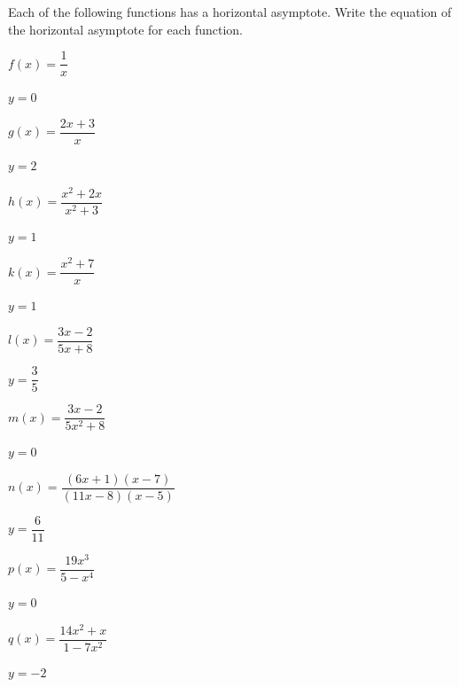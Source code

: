 \begin{exercises}
	 \begin{problem}
	 Each of the following functions has a horizontal asymptote. Write the equation
	 of the horizontal asymptote for each function.
	 \begin{multicols}{3}
		 \begin{subproblem}
			 $f(x) = \dfrac{1}{x}$
			 \begin{shortsolution}
				 $y=0$
			 \end{shortsolution}
		 \end{subproblem}
		 \begin{subproblem}
			 $g(x) = \dfrac{2x+3}{x}$
			 \begin{shortsolution}
				 $y=2$
			 \end{shortsolution}
		 \end{subproblem}
		 \begin{subproblem}
			 $h(x) = \dfrac{x^2+2x}{x^2+3}$
			 \begin{shortsolution}
				 $y=1$
			 \end{shortsolution}
		 \end{subproblem}
		 \begin{subproblem}
			 $k(x) = \dfrac{x^2+7}{x}$
			 \begin{shortsolution}
				 $y=1$
			 \end{shortsolution}
		 \end{subproblem}
		 \begin{subproblem}
			 $l(x)=\dfrac{3x-2}{5x+8}$
			 \begin{shortsolution}
				 $y=\dfrac{3}{5}$
			 \end{shortsolution}
		 \end{subproblem}
		 \begin{subproblem}
			 $m(x)=\dfrac{3x-2}{5x^2+8}$
			 \begin{shortsolution}
				 $y=0$
			 \end{shortsolution}
		 \end{subproblem}
		 \begin{subproblem}
			 $n(x)=\dfrac{(6x+1)(x-7)}{(11x-8)(x-5)}$
			 \begin{shortsolution}
				 $y=\dfrac{6}{11}$
			 \end{shortsolution}
		 \end{subproblem}
		 \begin{subproblem}
			 $p(x)=\dfrac{19x^3}{5-x^4}$
			 \begin{shortsolution}
				 $y=0$
			 \end{shortsolution}
		 \end{subproblem}
		 \begin{subproblem}
			 $q(x)=\dfrac{14x^2+x}{1-7x^2}$
			 \begin{shortsolution}
				 $y=-2$
			 \end{shortsolution}
		 \end{subproblem}
	 \end{multicols}
	 \end{problem}


\end{exercises}
